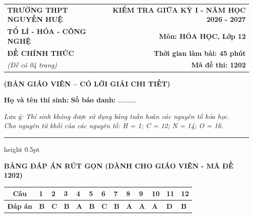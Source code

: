 \documentclass[11pt,a4paper]{article}
\begin{document}
\noindent
\begin{tabularx}{\textwidth}{@{}X r@{}}
\textbf{TRƯỜNG THPT NGUYỄN HUỆ} & \textbf{KIỂM TRA GIỮA KỲ I - NĂM HỌC 2026 - 2027} \\
\textbf{TỔ LÍ - HÓA - CÔNG NGHỆ} & \textbf{Môn: HÓA HỌC, Lớp 12} \\
\textbf{ĐỀ CHÍNH THỨC} & \textbf{Thời gian làm bài: 45 phút} \\
\textit{(Đề có 04 trang)} & \textbf{Mã đề thi: 1202}
\end{tabularx}

\begin{center}
{\color{hfRed}\textbf{\large (BẢN GIÁO VIÊN -- CÓ LỜI GIẢI CHI TIẾT)}}
\end{center}

\vspace{2pt}
\noindent\textbf{Họ và tên thí sinh:} \dotfill \textbf{Số báo danh:} \dots\dots\dots\dots

\vspace{2pt}
\noindent\textit{Lưu ý: Thí sinh không được sử dụng bảng tuần hoàn các nguyên tố hóa học.} \\
\textit{Cho nguyên tử khối của các nguyên tố: H = 1; C = 12; N = 14; O = 16.}
\vspace{2pt}
\hrule height 0.5pt
\vspace{6pt}

\begin{center}
{\color{hfRed}\textbf{\large BẢNG ĐÁP ÁN RÚT GỌN (DÀNH CHO GIÁO VIÊN - MÃ ĐỀ 1202)}}
\end{center}

\begin{center}
\renewcommand{\arraystretch}{1.2}
\begin{tabular}{|c|*{12}{>{\centering\arraybackslash}m{0.9cm}|}}
\hline
\rowcolor{tableGreen}
\textbf{Câu} & \textbf{1} & \textbf{2} & \textbf{3} & \textbf{4} & \textbf{5} & \textbf{6} & \textbf{7} & \textbf{8} & \textbf{9} & \textbf{10} & \textbf{11} & \textbf{12} \\
\hline
\textbf{Đáp án} & \textbf{\color{hfRed}B} & \textbf{\color{hfRed}C} & \textbf{\color{hfRed}B} & \textbf{\color{hfRed}A} & \textbf{\color{hfRed}B} & \textbf{\color{hfRed}C} & \textbf{\color{hfRed}B} & \textbf{\color{hfRed}A} & \textbf{\color{hfRed}A} & \textbf{\color{hfRed}A} & \textbf{\color{hfRed}D} & \textbf{\color{hfRed}B} \\
\hline
\end{tabular}
\end{center}
\end{document}
